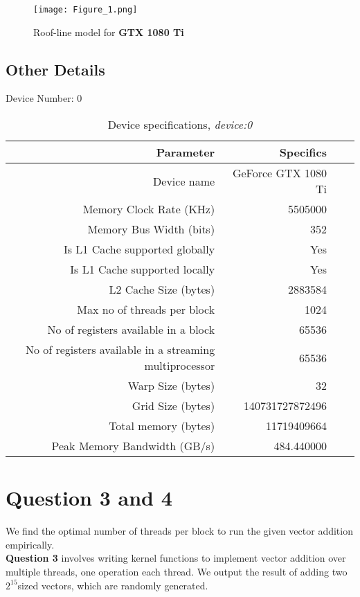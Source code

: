 \begin{figure}[ht]
\centering
\texttt{[image: Figure\_1.png]}
\caption{Roof-line model for \textbf{GTX 1080 Ti}}
\end{figure}

  \subsection{Other Details}
Device Number: 0
  
  
  \begin{table}[ht]
\footnotesize
\centering
\begin{tabular}{r||rrr}
Parameter & Specifics  \\ 
 \hline \hline
Device name & GeForce GTX 1080 Ti \\
  Memory Clock Rate (KHz) & 5505000 \\
  Memory Bus Width (bits) & 352 \\
  Is L1 Cache supported globally & Yes \\
  Is L1 Cache supported locally & Yes \\
  L2 Cache Size (bytes) & 2883584 \\
  Max no of threads per block & 1024 \\
  No of registers available in a block & 65536 \\
  No of registers available in a streaming multiprocessor & 65536 \\
  Warp Size (bytes)&  32 \\
  Grid Size (bytes) & 140731727872496 \\
  Total memory (bytes) & 11719409664 \\
  Peak Memory Bandwidth (GB/s) & 484.440000 \\
\end{tabular}
\caption{Device specifications, \textit{device:0}}
\end{table}

\newpage

\section {Question 3 and 4}
\noindent We find the optimal number of threads per block to run the given vector addition empirically. \\

\textbf{Question 3} involves writing kernel functions to implement vector addition over multiple threads, one operation each thread. We output the result of adding two $2^{15} $sized vectors, which are randomly generated. \\

